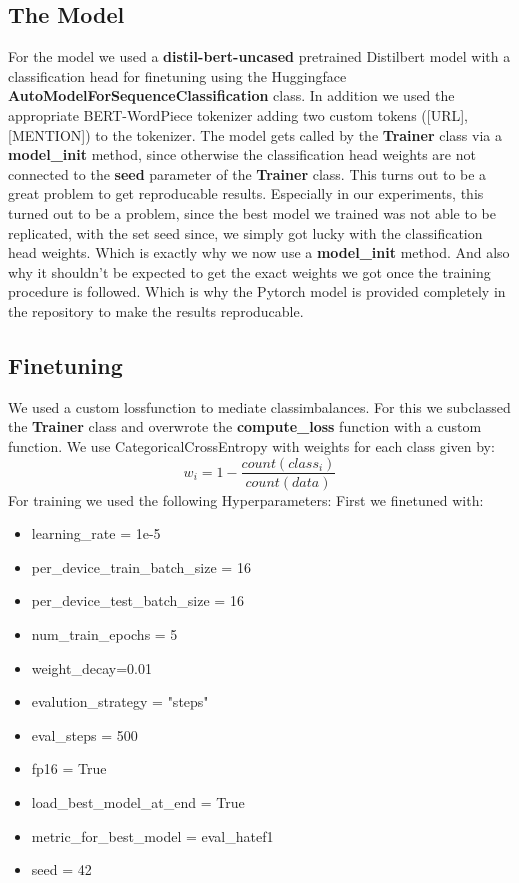 \documentclass[11pt,a4paper]{article}
\begin{document}
\subsection{The Model}
For the model we used a \textbf{distil-bert-uncased} pretrained Distilbert model with a classification head for finetuning
using the Huggingface \textbf{AutoModelForSequenceClassification} class. In addition we used the appropriate BERT-WordPiece 
tokenizer adding two custom tokens ([URL],[MENTION]) to the tokenizer.
The model gets called by the \textbf{Trainer} class via a \textbf{model\_init} method, since otherwise the classification head
weights are not connected to the \textbf{seed} parameter of the \textbf{Trainer} class.
This turns out to be a great problem to get reproducable results.
Especially in our experiments, this turned out to be a problem, since the best model we trained was not able to be replicated,
with the set seed since, we simply got lucky with the classification head weights. Which is exactly why we now use a \textbf{model\_init} method.
And also why it shouldn't be expected to get the exact weights we got once the training procedure is followed.
Which is why the Pytorch model is provided completely in the repository to make the results reproducable.

\subsection{Finetuning}
We used a custom lossfunction to mediate classimbalances.
For this we subclassed the \textbf{Trainer} class and overwrote the \textbf{compute\_loss} function with a custom function.
We use CategoricalCrossEntropy with weights for each class given by:
$$ w_i = 1 - \frac{count(class_i)}{count(data)}$$
For training we used the following Hyperparameters:
First we finetuned with: 
\begin{itemize}
    \setlength{\itemsep}{0.5pt}
    \item learning\_rate = 1e-5
    \item per\_device\_train\_batch\_size = 16
    \item per\_device\_test\_batch\_size = 16
    \item num\_train\_epochs = 5
    \item weight\_decay=0.01
    \item evalution\_strategy = "steps"
    \item eval\_steps = 500
    \item fp16 = True
    \item load\_best\_model\_at\_end = True
    \item metric\_for\_best\_model = eval\_hatef1
    \item seed = 42
\end{itemize}
\end{document}
